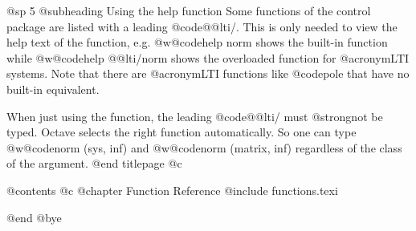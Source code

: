 @sp 5
@subheading Using the help function
Some functions of the control package are listed with a leading @code{@@lti/}.
This is only needed to view the help text of the function, e.g. @w{@code{help norm}}
shows the built-in function while @w{@code{help @@lti/norm}} shows the overloaded
function for @acronym{LTI} systems. Note that there are @acronym{LTI} functions
like @code{pole} that have no built-in equivalent.

When just using the function, the leading @code{@@lti/} must @strong{not} be typed.
Octave selects the right function automatically. So one can type @w{@code{norm (sys, inf)}}
and @w{@code{norm (matrix, inf)}} regardless of the class of the argument.
@end titlepage
@c %

@contents
@c @chapter Function Reference
@include functions.texi

@end
@bye
